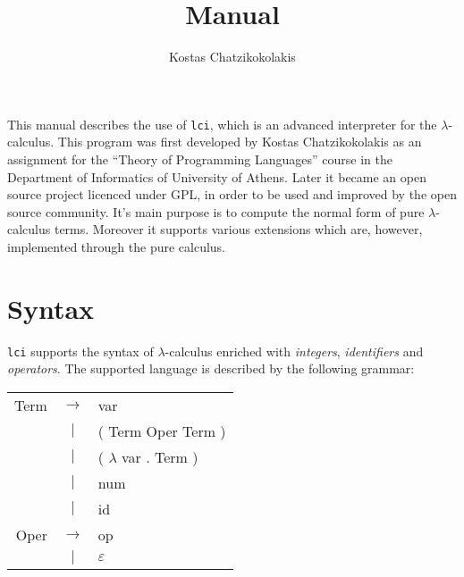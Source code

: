 \documentclass[a4paper,11pt]{article}
\author{
	Kostas Chatzikokolakis
}
\title{
	\kwd{lci} Manual
}
\date{}
\newcommand{\la}{$\lambda$}
\newcommand{\lci}{\texttt{lci}}
\newcommand{\lc}{$\lambda$-calculus}
\newcommand{\qm}[1]{``#1''}
\begin{document}
\maketitle

This manual describes the use of \lci{}, which is an advanced
interpreter for the \lc. This program was first developed by Kostas
Chatzikokolakis as an assignment for the \qm{Theory of Programming Languages} course
in the Department of Informatics of University of Athens. Later it became an
open source project licenced under GPL, in order to be used and improved by
the open source community. It's main purpose is to compute the normal form of
pure \lc{} terms. Moreover it supports various extensions which are, however,
implemented through the pure calculus.

\tableofcontents

\section{Syntax}
\lci{} supports the syntax of \lc{} enriched with \emph{integers}, \emph{identifiers}
and \emph{operators}. The supported language is described by the following grammar:

\begin{center}
	\begin{tabular}{rcl}
		Term	& $\rightarrow$ & var \\
		& $|$ & ( Term Oper Term ) \\
		& $|$ & ( \la{} var . Term ) \\
		& $|$ & num \\
		& $|$ & id \\
		Oper & $\rightarrow$ & op \\
		& $|$ & $\varepsilon$
	\end{tabular}
\end{center}
\end{document}
